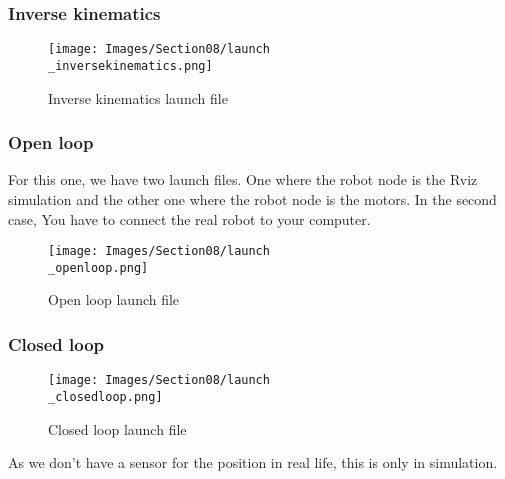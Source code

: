 \subsubsection{Inverse kinematics}
\begin{figure}[ht]
    \centering
    \texttt{[image: Images/Section08/launch\\\_inversekinematics.png]}
    \caption{Inverse kinematics launch file}
    \label{fig:InverseKinLaunch}
\end{figure}
\FloatBarrier

\subsubsection{Open loop}

For this one, we have two launch files. One where the robot node is the Rviz simulation and the other one where the robot node is the motors. In the second case, You have to connect the real robot to your computer.

\begin{figure}[ht]
    \centering
    \texttt{[image: Images/Section08/launch\\\_openloop.png]}
    \caption{Open loop launch file}
    \label{fig:OpenLoopLaunch}
\end{figure}
\FloatBarrier

\subsubsection{Closed loop}
\begin{figure}[t!]
    \centering
    \texttt{[image: Images/Section08/launch\\\_closedloop.png]}
    \caption{Closed loop launch file}
    \label{fig:ClosedLoopLaunch}
\end{figure}
\FloatBarrier

\bigbreak
As we don't have a sensor for the position in real life, this is only in simulation.

